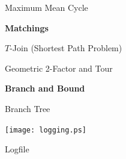 \documentclass{report}
\begin{document}
\begin{landscape}
\begin{minipage}{11cm}
\begin{center}
\hspace*{0cm}
\epsfxsize=9cm
\end{center}
\end{minipage}
\hspace*{2cm}
\begin{minipage}{11cm}
\begin{center}
\epsfxsize=11cm

\vspace*{2cm}
{\huge Maximum Mean Cycle}
\end{center}
\end{minipage}


\clearpage
{\Huge\bf Matchings}

\vspace*{2cm}
\begin{minipage}{8cm}
\begin{center}
{\huge $T$-Join (Shortest Path Problem)}
\vspace*{2cm}

\epsfxsize=8cm
\end{center}
\end{minipage}
\hspace*{3cm}
\begin{minipage}{12cm}
\begin{center}
\epsfxsize=12cm

\vspace*{2cm}
{\huge Geometric 2-Factor and Tour}
\end{center}
\end{minipage}


\clearpage
{\Huge\bf Branch and Bound}

\vspace*{2cm}
\begin{minipage}{8cm}
\begin{center}
{\huge Branch Tree}
\vspace*{2cm}

\epsfxsize=8cm
\end{center}
\end{minipage}
\hspace*{2cm}
\begin{minipage}{15cm}
\begin{center}
\texttt{[image: logging.ps]}

\vspace*{2cm}
{\huge Logfile}
\end{center}
\end{minipage}



\end{landscape}
\end{document}
